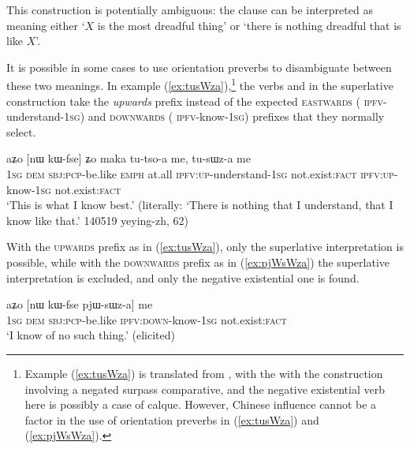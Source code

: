 This construction is potentially ambiguous: the clause  can be interpreted as meaning either  `$X$ is the most dreadful thing' or `there is nothing dreadful that is like $X$'. 

It is possible in some cases to use orientation preverbs to disambiguate between these two meanings. In example (\ref{ex:tusWza}),\footnote{Example  (\ref{ex:tusWza}) is translated from , with the  with the construction  involving a negated surpass comparative, and the negative existential verb here is possibly a case of calque. However, Chinese influence cannot be a factor in the  use of orientation preverbs in (\ref{ex:tusWza}) and (\ref{ex:pjWsWza}). } the verbs  and  in the superlative construction take the \textsl{upwards} prefix  instead of the expected \textsc{eastwards} ( \textsc{ipfv}-understand-\textsc{1sg}) and \textsc{downwards} ( \textsc{ipfv}-know-\textsc{1sg}) prefixes that they normally select.

\begin{exe}
\ex \label{ex:tusWza}
\gll aʑo [nɯ kɯ-fse] ʑo maka tu-tso-a me, tu-sɯz-a me \\
\textsc{1sg} \textsc{dem} \textsc{sbj}:\textsc{pcp}-be.like \textsc{emph} at.all \textsc{ipfv}:\textsc{up}-understand-\textsc{1sg} not.exist:\textsc{fact} \textsc{ipfv}:\textsc{up}-know-\textsc{1sg} not.exist:\textsc{fact} \\
\glt `This is what I know best.' (literally: `There is nothing that I understand, that I know like that.' 140519 yeying-zh, 62)
\end{exe}

With the \textsc{upwards} prefix  as in (\ref{ex:tusWza}), only the superlative interpretation is possible, while with the \textsc{downwards} prefix  as in (\ref{ex:pjWsWza}) the superlative interpretation is excluded, and only the negative existential one is found.

\begin{exe}
\ex \label{ex:pjWsWza}
\gll aʑo [nɯ kɯ-fse pjɯ-sɯz-a] me \\
\textsc{1sg} \textsc{dem} \textsc{sbj}:\textsc{pcp}-be.like \textsc{ipfv}:\textsc{down}-know-\textsc{1sg} not.exist:\textsc{fact} \\
\glt `I know of no such thing.' (elicited)
\end{exe}

